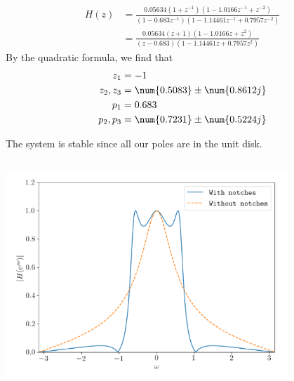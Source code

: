 \documentclass{article}
\let\Re\relax
\DeclareMathOperator{\Re}{\mathfrak{R}}
\let\Im\relax
\DeclareMathOperator{\Im}{\mathfrak{I}}
\begin{document}
\begin{align}
    H(z) &= \frac{\num{0.05634} (1 + z^{-1}) (1 - \num{1.0166} z^{-1} + z^{-2})}{(1 - \num{0.683} z^{-1}) (1 - \num{1.14461} z^{-1} + \num{0.7957} z^{-2})} \\
    &= \frac{\num{0.05634} (z + 1) (1 - \num{1.0166} z + z^2)}{(z - \num{0.683}) (1 - \num{1.14461} z + \num{0.7957} z^2)}
\end{align}
By the quadratic formula, we find that
\begin{align}
    z_1 &= -1 \\
    z_2, z_3 &= \num{0.5083} \pm \num{0.8612j} \\
    p_1 &= 0.683 \\
    p_2, p_3 &= \num{0.7231} \pm \num{0.5224j}
\end{align}

\begin{center}
\end{center}
The system is stable since all our poles are in the unit disk.

\subsection{}

\begin{center}
    \includegraphics[width=0.8\textwidth]{Screenshot 2021-04-26 at 15-44-44 Files.png}
\end{center}
\end{document}
